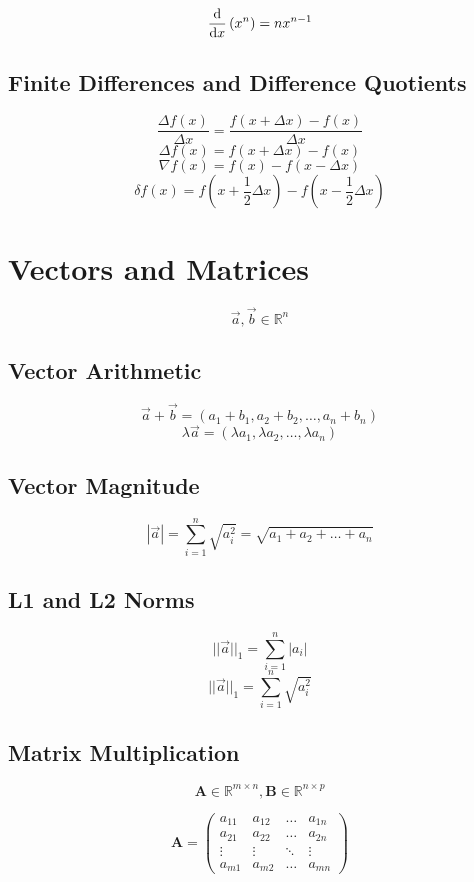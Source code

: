 \documentclass[a4paper]{article}
\begin{document}
$$ \dv{}{x}\left(x^n\right)  = nx^{n-1} $$

\subsection{Finite Differences and Difference Quotients}

$$ \frac{\Delta f(x)}{\Delta x} = \frac{f\left(x+\Delta x\right) - f(x)}{\Delta x} $$
$$ \Delta f(x) = f\left(x+\Delta x\right) - f(x) $$
$$ \nabla f(x) = f(x) - f\left(x - \Delta x\right) $$
$$ \delta f(x) = f\left(x+\frac{1}{2}\Delta x\right) - f\left(x - \frac{1}{2}\Delta x\right) $$

\section{Vectors and Matrices}

$$ \vec{a}, \vec{b} \in \mathbb{R}^n $$

\subsection{Vector Arithmetic}

$$ \vec{a} + \vec{b} = (a_1+b_1, a_2+b_2, \ldots, a_n+b_n) $$
$$ \lambda\vec{a} = (\lambda a_1, \lambda a_2,\ldots, \lambda a_n) $$

\subsection{Vector Magnitude}

$$ |\vec{a}| = \sum_{i=1}^{n}\sqrt{a_i^2} = \sqrt{a_1 + a_2 + \ldots + a_n} $$

\subsection{L1 and L2 Norms}

$$ ||\vec{a}||_1 = \sum_{i=1}^{n} |a_i| $$
$$ ||\vec{a}||_1 = \sum_{i=1}^{n} \sqrt{a_i^2} $$

\subsection{Matrix Multiplication}

$$ \mathbf{A} \in \mathbb{R}^{m \times n}, \mathbf{B} \in \mathbb{R}^{n \times p} $$

$$ \mathbf{A} = 
\begin{pmatrix}
a_{11} & a_{12} & \ldots & a_{1n} \\
a_{21} & a_{22} & \ldots & a_{2n} \\
\vdots & \vdots & \ddots & \vdots \\
a_{m1} & a_{m2} & \ldots & a_{mn}
\end{pmatrix}
$$
\end{document}
